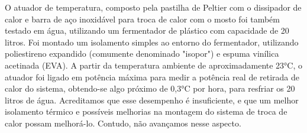 O atuador de temperatura, composto pela pastilha de Peltier com o dissipador de calor e barra de aço inoxidável para troca de
calor com o mosto foi também testado em água, utilizando um fermentador de plástico com capacidade de 20 litros. Foi montado
um isolamento simples ao entorno do fermentador, utilizando poliestireno expandido (comumente denominado "isopor") e espuma
vinílica acetinada (EVA). A partir da temperatura ambiente de aproximadamente 23°C, o atuador foi ligado em potência máxima
para medir a potência real de retirada de calor do sistema, obtendo-se algo próximo de 0,3°C por hora, para resfriar os 20 litros
de água. Acreditamos que esse desempenho é insuficiente, e que um melhor isolamento térmico e possíveis melhorias na montagem
do sistema de troca de calor possam melhorá-lo. Contudo, não avançamos nesse aspecto.



